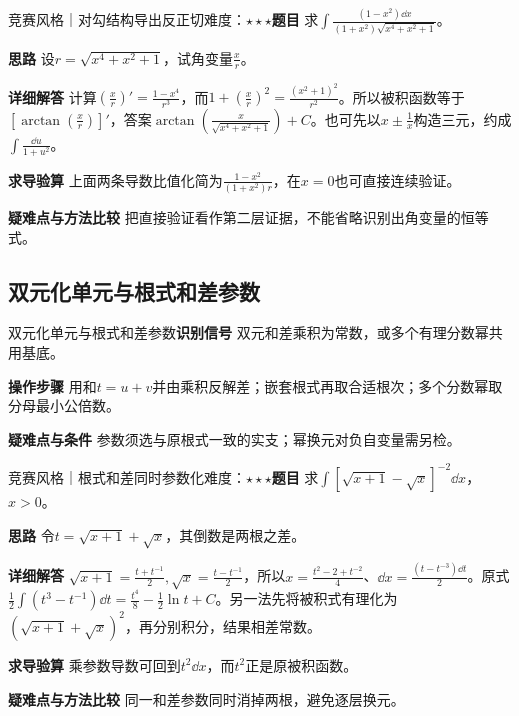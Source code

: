 \begin{example}{竞赛风格｜对勾结构导出反正切}{难度：$\star\star\star$}\label{ic:ex:indefinite_dual_complete:reciprocalangle}\textbf{题目} 求$\int\frac{(1-x^2)\dd x}{(1+x^2)\sqrt{x^4+x^2+1}}$。\par \textbf{思路} 设$r=\sqrt{x^4+x^2+1}$，试角变量$\frac{x}{r}$。\par \textbf{详细解答} 计算$(\frac{x}{r})'=\frac{1-x^4}{r^3}$，而$1+(\frac{x}{r})^2=\frac{(x^2+1)^2}{r^2}$。所以被积函数等于$[\arctan(\frac{x}{r})]'$，答案$\arctan(\frac{x}{\sqrt{x^4+x^2+1}})+C$。也可先以$x\pm\frac{1}{x}$构造三元，约成$\int\frac{\dd u}{1+u^2}$。\par \textbf{求导验算} 上面两条导数比值化简为$\frac{1-x^2}{(1+x^2)r}$，在$x=0$也可直接连续验证。\par \textbf{疑难点与方法比较} 把直接验证看作第二层证据，不能省略识别出角变量的恒等式。\end{example}

\subsection{双元化单元与根式和差参数}\label{ic:indefinite_dual_complete:single}\begin{method}{双元化单元与根式和差参数}\textbf{识别信号} 双元和差乘积为常数，或多个有理分数幂共用基底。\par \textbf{操作步骤} 用和$t=u+v$并由乘积反解差；嵌套根式再取合适根次；多个分数幂取分母最小公倍数。\par \textbf{疑难点与条件} 参数须选与原根式一致的实支；幂换元对负自变量需另检。\end{method}

\begin{example}{竞赛风格｜根式和差同时参数化}{难度：$\star\star\star$}\label{ic:ex:indefinite_dual_complete:nestedtwo}\textbf{题目} 求$\int[\sqrt{x+1}-\sqrt x]^{-2}\dd x$，$x>0$。\par \textbf{思路} 令$t=\sqrt{x+1}+\sqrt x$，其倒数是两根之差。\par \textbf{详细解答} $\sqrt{x+1}=\frac{t+t^{-1}}{2},\sqrt x=\frac{t-t^{-1}}{2}$，所以$x=\frac{t^2-2+t^{-2}}{4}$、$\dd x=\frac{(t-t^{-3})\dd t}{2}$。原式$\frac12\int(t^3-t^{-1})\dd t=\frac{t^4}{8}-\frac12\ln t+C$。另一法先将被积式有理化为$(\sqrt{x+1}+\sqrt x)^2$，再分别积分，结果相差常数。\par \textbf{求导验算} 乘参数导数可回到$t^2\dd x$，而$t^2$正是原被积函数。\par \textbf{疑难点与方法比较} 同一和差参数同时消掉两根，避免逐层换元。\end{example}

